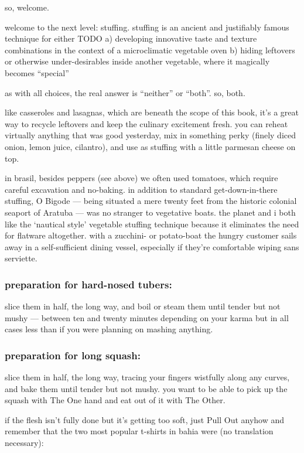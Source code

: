 so,
	welcome.

welcome to the next level: stuffing. stuffing is an ancient and justifiably 
famous technique for either
TODO
	a) developing innovative taste and texture combinations in the context of a microclimatic vegetable oven
	b) hiding leftovers or otherwise under-desirables inside another vegetable, where it magically becomes ``special''

as with all choices, the real answer is ``neither'' or ``both''. so, both.

like casseroles and lasagnas, which are beneath the scope of this book, it's a 
great way to recycle leftovers and keep the culinary excitement fresh. you can 
reheat virtually anything that was good yesterday, mix in something perky 
(finely diced onion, lemon juice, cilantro), and use as stuffing with a little 
parmesan cheese on top.

in brasil, besides peppers (see above) we often used tomatoes, which require 
careful excavation and no-baking. in addition to standard get-down-in-there 
stuffing, O Bigode --- being situated a mere twenty feet from the historic 
colonial seaport of Aratuba --- was no stranger to vegetative boats. the 
planet and i both like the `nautical style' vegetable stuffing technique 
because it eliminates the need for flatware altogether. with a zucchini- or 
potato-boat the hungry customer sails away in a self-sufficient dining vessel, 
especially if they're comfortable wiping sans serviette.

\subsubsection{preparation for hard-nosed tubers:}
slice them in half, the long way, and boil or steam them until tender but not 
mushy --- between ten and twenty minutes depending on your karma but in all 
cases less than if you were planning on mashing anything.

\subsubsection{preparation for long squash:}
slice them in half, the long way, tracing your fingers wistfully along any 
curves, and bake them until tender but not mushy. you want to be able to pick 
up the squash with The One hand and eat out of it with The Other.

if the flesh isn't fully done but it's getting too soft, just Pull Out anyhow 
and remember that the two most popular t-shirts in bahia were (no translation 
necessary):

